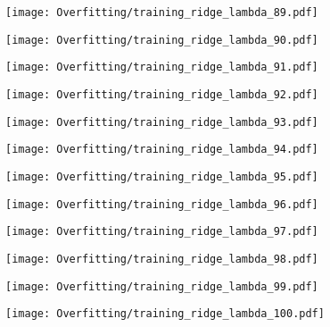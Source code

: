 \documentclass[xcolor=pdftex,dvipsnames,table]{beamer}
\begin{document}
\frame
{
	\begin{center}
		\texttt{[image: Overfitting/training\_ridge\_lambda\_89.pdf]}
	\end{center}
}

\frame
{
	\begin{center}
		\texttt{[image: Overfitting/training\_ridge\_lambda\_90.pdf]}
	\end{center}
}

\frame
{
	\begin{center}
		\texttt{[image: Overfitting/training\_ridge\_lambda\_91.pdf]}
	\end{center}
}

\frame
{
	\begin{center}
		\texttt{[image: Overfitting/training\_ridge\_lambda\_92.pdf]}
	\end{center}
}

\frame
{
	\begin{center}
		\texttt{[image: Overfitting/training\_ridge\_lambda\_93.pdf]}
	\end{center}
}

\frame
{
	\begin{center}
		\texttt{[image: Overfitting/training\_ridge\_lambda\_94.pdf]}
	\end{center}
}

\frame
{
	\begin{center}
		\texttt{[image: Overfitting/training\_ridge\_lambda\_95.pdf]}
	\end{center}
}

\frame
{
	\begin{center}
		\texttt{[image: Overfitting/training\_ridge\_lambda\_96.pdf]}
	\end{center}
}

\frame
{
	\begin{center}
		\texttt{[image: Overfitting/training\_ridge\_lambda\_97.pdf]}
	\end{center}
}

\frame
{
	\begin{center}
		\texttt{[image: Overfitting/training\_ridge\_lambda\_98.pdf]}
	\end{center}
}

\frame
{
	\begin{center}
		\texttt{[image: Overfitting/training\_ridge\_lambda\_99.pdf]}
	\end{center}
}

\frame
{
	\begin{center}
		\texttt{[image: Overfitting/training\_ridge\_lambda\_100.pdf]}
	\end{center}
}
\end{document}
